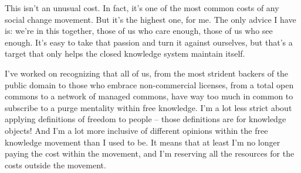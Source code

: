 This isn't an unusual cost. In fact, it's one of the most common costs
of any social change movement. But it's the highest one, for me. The
only advice I have is: we're in this together, those of us who care
enough, those of us who see enough. It's easy to take that passion and
turn it against ourselves, but that's a target that only helps the
closed knowledge system maintain itself.

I've worked on recognizing that all of us, from the most strident
backers of the public domain to those who embrace non-commercial
licenses, from a total open commons to a network of managed commons,
have way too much in common to subscribe to a purge mentality within
free knowledge. I'm a lot less strict about applying definitions of
freedom to people -- those definitions are for knowledge objects! And
I'm a lot more inclusive of different opinions within the free knowledge
movement than I used to be. It means that at least I'm no longer paying
the cost within the movement, and I'm reserving all the resources for
the costs outside the movement.
